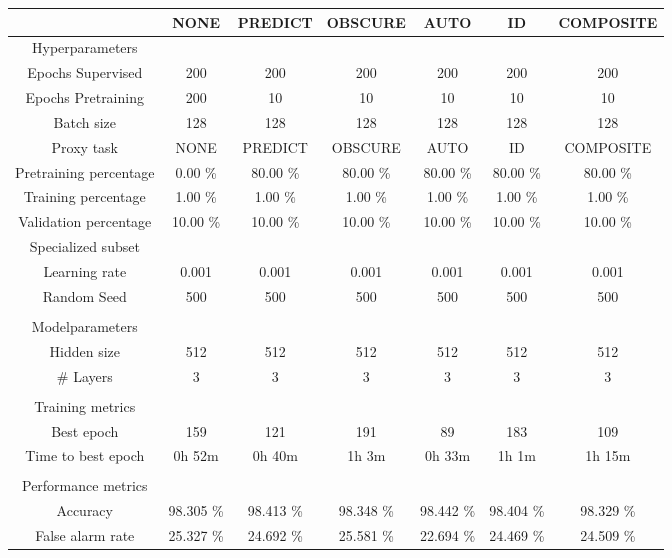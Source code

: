 \begin{table}[htb]
    \centering
    \begin{tabular}{@{}ccccccc@{}}
        \toprule
         &  NONE &  PREDICT &  OBSCURE &  AUTO &  ID &  COMPOSITE \\
        \midrule
        Hyperparameters &  &  &  &  &  &  \\
        Epochs Supervised &  200 &  200 &  200 &  200 &  200 &  200 \\
        Epochs Pretraining &  200 &  10 &  10 &  10 &  10 &  10 \\
        Batch size &  128 &  128 &  128 &  128 &  128 &  128 \\
        Proxy task &  NONE &  PREDICT &  OBSCURE &  AUTO &  ID &  COMPOSITE \\
        Pretraining percentage &  0.00 \% &  80.00 \% &  80.00 \% &  80.00 \% &  80.00 \% &  80.00 \% \\
        Training percentage &  1.00 \% &  1.00 \% &  1.00 \% &  1.00 \% &  1.00 \% &  1.00 \% \\
        Validation percentage &  10.00 \% &  10.00 \% &  10.00 \% &  10.00 \% &  10.00 \% &  10.00 \% \\
        Specialized subset &   &   &   &   &   &   \\
        Learning rate &  0.001 &  0.001 &  0.001 &  0.001 &  0.001 &  0.001 \\
        Random Seed &  500 &  500 &  500 &  500 &  500 &  500 \\
         \\
        Modelparameters &  &  &  &  &  &  \\
        Hidden size &  512 &  512 &  512 &  512 &  512 &  512 \\
        \# Layers &  3 &  3 &  3 &  3 &  3 &  3 \\
         \\
        Training metrics &  &  &  &  &  &  \\
        Best epoch &  159 &  121 &  191 &  89 &  183 &  109 \\
        Time to best epoch &  0h 52m &  0h 40m &  1h 3m &  0h 33m &  1h 1m &  1h 15m \\
         \\
        Performance metrics &  &  &  &  &  &  \\
        Accuracy &  98.305 \% &  98.413 \% &  98.348 \% &  98.442 \% &  98.404 \% &  98.329 \% \\
        False alarm rate &  25.327 \% &  24.692 \% &  25.581 \% &  22.694 \% &  24.469 \% &  24.509 \% \\

\end{tabular}
\end{table}
